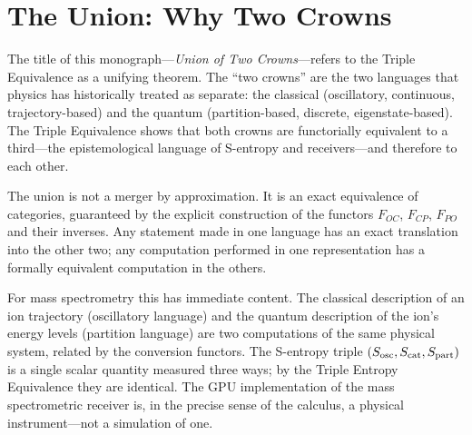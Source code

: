 \section{The Union: Why Two Crowns}
\label{sec:ch15-union}

The title of this monograph---\emph{Union of Two Crowns}---refers to the
Triple Equivalence as a unifying theorem.  The ``two crowns'' are the two
languages that physics has historically treated as separate: the classical
(oscillatory, continuous, trajectory-based) and the quantum (partition-based,
discrete, eigenstate-based).  The Triple Equivalence shows that both crowns are
functorially equivalent to a third---the epistemological language of S-entropy
and receivers---and therefore to each other.

The union is not a merger by approximation.  It is an exact equivalence of
categories, guaranteed by the explicit construction of the functors $F_{OC}$,
$F_{CP}$, $F_{PO}$ and their inverses.  Any statement made in one language has
an exact translation into the other two; any computation performed in one
representation has a formally equivalent computation in the others.

For mass spectrometry this has immediate content.  The classical description
of an ion trajectory (oscillatory language) and the quantum description of the
ion's energy levels (partition language) are two computations of the same
physical system, related by the conversion functors.  The S-entropy triple
$(S_{\mathrm{osc}}, S_{\mathrm{cat}}, S_{\mathrm{part}})$ is a single scalar quantity measured three ways; by the
Triple Entropy Equivalence they are identical.  The GPU implementation of the
mass spectrometric receiver is, in the precise sense of the calculus, a
physical instrument---not a simulation of one.

